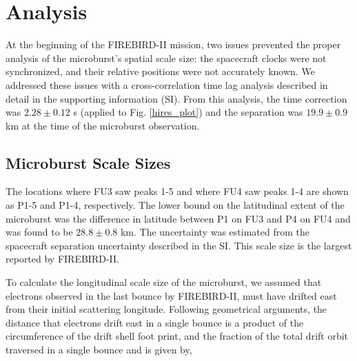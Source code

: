 \documentclass[draft, linenumbers]{agujournal}
\begin{document}
\section{Analysis} \label{analysis} %
At the beginning of the FIREBIRD-II mission, two issues prevented the proper analysis of the microburst's spatial scale size: the spacecraft clocks were not synchronized, and their relative positions were not accurately known. We addressed these issues with a cross-correlation time lag analysis described in detail in the supporting information (SI). From this analysis, the time correction was $2.28 \pm 0.12$ s (applied to Fig. \ref{hires_plot}) and the separation was $19.9 \pm 0.9$ km at the time of the microburst observation.

\subsection{Microburst Scale Sizes} \label{scale_size} %
 The locations where FU3 saw peaks 1-5 and where FU4 saw peaks 1-4 are shown as P1-5 and P1-4, respectively. The lower bound on the latitudinal extent of the microburst was the difference in latitude between P1 on FU3 and P4 on FU4 and was found to be $28.8 \pm 0.8$ km. The uncertainty was estimated from the spacecraft separation uncertainty described in the SI. This scale size is the largest reported by FIREBIRD-II.

To calculate the longitudinal scale size of the microburst, we assumed that  electrons observed in the last bounce by FIREBIRD-II, must have drifted east from their initial scattering longitude. Following geometrical arguments, the distance that electrons drift east in a single bounce is a product of the circumference of the drift shell foot print, and the fraction of the total drift orbit traversed in a single bounce and is given by, 
\end{document}

